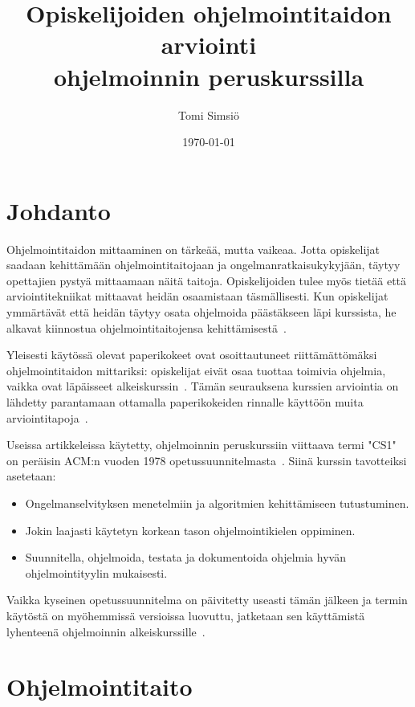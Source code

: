 \documentclass[finnish]{../tktltiki2}
\title{Opiskelijoiden ohjelmointitaidon arviointi \texorpdfstring{\\}{}ohjelmoinnin peruskurssilla}
\author{Tomi Simsiö}
\date{\today}
\theoremstyle{definition}
\theoremstyle{remark}
\begin{document}

\maketitle
\tableofcontents
\newpage



\section{Johdanto}

Ohjelmointitaidon mittaaminen on tärkeää, mutta vaikeaa. Jotta opiskelijat saadaan kehittämään ohjelmointitaitojaan ja ongelmanratkaisukykyjään, täytyy opettajien pystyä mittaamaan näitä taitoja. Opiskelijoiden tulee myös tietää että arviointitekniikat mittaavat heidän osaamistaan täsmällisesti. Kun opiskelijat ymmärtävät että heidän täytyy osata ohjelmoida päästäkseen läpi kurssista, he alkavat kiinnostua ohjelmointitaitojensa kehittämisestä~\cite{DW04}.

Yleisesti käytössä olevat paperikokeet ovat osoittautuneet riittämättö\-mäksi ohjelmointitaidon mittariksi: opiskelijat eivät osaa tuottaa toimivia ohjelmia, vaikka ovat läpäisseet alkeiskurssin~\cite{MAD01}. Tämän seurauksena kurssien arviointia on lähdetty parantamaan ottamalla paperikokeiden rinnalle käyttöön muita arviointitapoja~\cite{CJ01, CG02, WM03}.

Useissa artikkeleissa käytetty, ohjelmoinnin peruskurssiin viittaava termi "CS1" on peräisin ACM:n vuoden 1978 opetussuunnitelmasta~\cite{ACM78}. Siinä kurssin tavotteiksi asetetaan:
\begin{itemize}
  \item Ongelmanselvityksen menetelmiin ja algoritmien kehittämiseen tutustuminen.
  \item Jokin laajasti käytetyn korkean tason ohjelmointikielen oppiminen.
  \item Suunnitella, ohjelmoida, testata ja dokumentoida ohjelmia hyvän ohjelmointityylin mukaisesti.
\end{itemize}
Vaikka kyseinen opetussuunnitelma on päivitetty useasti tämän jälkeen ja termin käytöstä on myöhemmissä versioissa luovuttu, jatketaan sen käyttämistä lyhenteenä ohjelmoinnin alkeiskurssille~\cite{H10}.

\section{Ohjelmointitaito}
\end{document}
